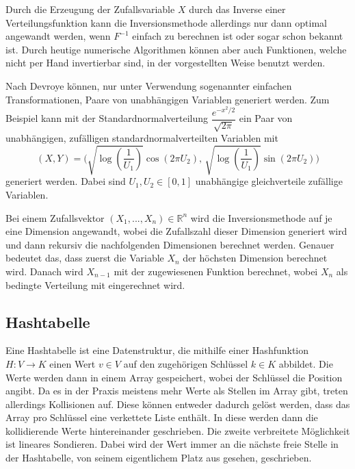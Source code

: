 Durch die Erzeugung der Zufallsvariable $X$ durch das Inverse einer 
Verteilungsfunktion kann die Inversionsmethode allerdings nur dann optimal 
angewandt werden, wenn $F^{-1}$ einfach zu berechnen ist oder sogar schon bekannt 
ist. Durch heutige numerische Algorithmen können aber auch Funktionen, welche 
nicht \glqq per Hand\grqq{} invertierbar sind, in der vorgestellten Weise benutzt 
werden. 

Nach Devroye können, nur unter Verwendung sogenannter \glqq einfachen 
Transformationen\grqq, Paare von unabhängigen Variablen generiert werden. Zum 
Beispiel kann mit der Standardnormalverteilung $\dfrac{e^{-x^2/2}}{\sqrt{2\pi}}$ 
ein Paar von unabhängigen, zufälligen standardnormalverteilten Variablen mit 
\begin{equation}
    (X, Y) = \bigg( \sqrt{\log(\dfrac{1}{U_1})}\cos(2\pi U_2),\, \sqrt{\log(
        \dfrac{1}{U_1})}\sin(2\pi U_2) \bigg)
    \label{eq:stdnormdensity}
\end{equation}
generiert werden. Dabei sind $U_1, U_2 \in [0, 1]$ unabhängige gleichverteile 
zufällige Variablen.

Bei einem Zufallsvektor $ (X_1, ..., X_n) \in \mathbb{R}^n$ wird die 
Inversionsmethode auf je eine Dimension angewandt, wobei die Zufallszahl dieser 
Dimension generiert wird und dann rekursiv die nachfolgenden Dimensionen 
berechnet werden. Genauer bedeutet das, dass zuerst die Variable $X_n$ der 
höchsten Dimension berechnet wird. Danach wird $X_{n-1}$ mit der zugewiesenen 
Funktion berechnet, wobei $X_n$ als bedingte Verteilung mit eingerechnet wird.


\subsection{Hashtabelle}
Eine Hashtabelle ist eine Datenstruktur, die mithilfe einer Hashfunktion 
$H: V \rightarrow K$ einen Wert $v \in V$ auf den zugehörigen Schlüssel $k \in K$ 
abbildet. Die Werte werden dann in einem Array gespeichert, wobei der Schlüssel 
die Position angibt. Da es in der Praxis meistens mehr Werte als Stellen im Array 
gibt, treten allerdings Kollisionen auf. Diese können entweder dadurch gelöst 
werden, dass das Array pro Schlüssel eine verkettete Liste enthält. In diese 
werden dann die kollidierende Werte hintereinander geschrieben. Die zweite 
verbreitete Möglichkeit ist lineares Sondieren. Dabei wird der Wert immer an die 
nächste freie Stelle in der Hashtabelle, von seinem eigentlichem Platz aus 
gesehen, geschrieben.


